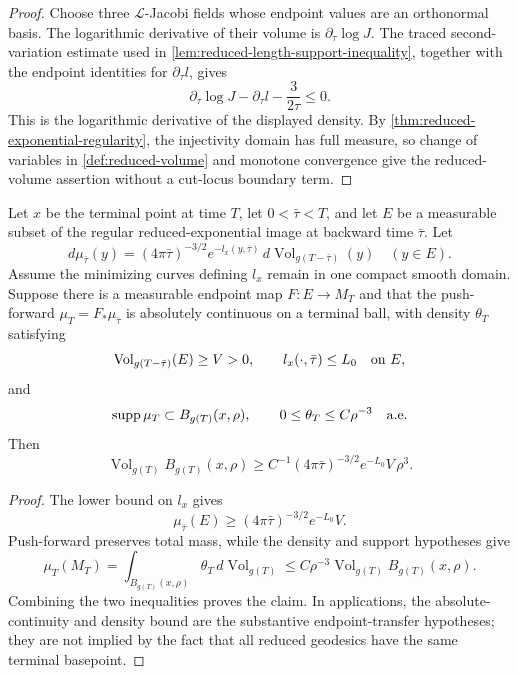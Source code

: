\begin{proof}
Choose three $\mathcal L$-Jacobi fields whose endpoint values are an
orthonormal basis.  The logarithmic derivative of their volume is
$\partial_\tau\log J$.  The traced second-variation estimate used in
\ref{lem:reduced-length-support-inequality}, together with the endpoint
identities for $\partial_\tau l$, gives
\[
 \partial_\tau\log J-\partial_\tau l-\frac{3}{2\tau}\le0.
\]
This is the logarithmic derivative of the displayed density.  By
\ref{thm:reduced-exponential-regularity}, the injectivity domain has full
measure, so change of variables in \ref{def:reduced-volume} and monotone
convergence give the reduced-volume assertion without a cut-locus boundary
term.
\end{proof}

\begin{theorem}
\label{thm:reduced-volume-transfer}
\notready
Let $x$ be the terminal point at time $T$, let $0<\bar\tau<T$, and let
$E$ be a measurable subset of the regular reduced-exponential image at
backward time $\bar\tau$.  Let
\[
 d\mu_{\bar\tau}(y)=(4\pi\bar\tau)^{-3/2}
 e^{-l_x(y,\bar\tau)}\,d\operatorname{Vol}_{g(T-\bar\tau)}(y)
 \quad (y\in E).
\]
Assume the minimizing curves defining $l_x$ remain in one compact smooth
domain.  Suppose there is a measurable endpoint map
$F:E\to M_T$ and that the push-forward $\mu_T=F_*\mu_{\bar\tau}$ is
absolutely continuous on a terminal ball, with density $\theta_T$ satisfying
 \[
 \operatorname{Vol}_{g(T-\bar\tau)}(E)\ge V>0,
 \qquad l_x(\cdot,\bar\tau)\le L_0\quad\hbox{on }E,
 \]
and
\[
 \operatorname{supp}\mu_T\subset B_{g(T)}(x,\rho),
 \qquad 0\le\theta_T\le C\rho^{-3}\quad\hbox{a.e.}
 \]
Then
\[
 \operatorname{Vol}_{g(T)}B_{g(T)}(x,\rho)
 \ge C^{-1}(4\pi\bar\tau)^{-3/2}e^{-L_0}V\,\rho^3.
\]
\end{theorem}

\begin{proof}
The lower bound on $l_x$ gives
\[
 \mu_{\bar\tau}(E)\ge(4\pi\bar\tau)^{-3/2}e^{-L_0}V.
\]
Push-forward preserves total mass, while the density and support hypotheses
give
\[
 \mu_T(M_T)=\int_{B_{g(T)}(x,\rho)}\theta_T\,d\operatorname{Vol}_{g(T)}
 \le C\rho^{-3}\operatorname{Vol}_{g(T)}B_{g(T)}(x,\rho).
\]
Combining the two inequalities proves the claim.  In applications, the
absolute-continuity and density bound are the substantive endpoint-transfer
hypotheses; they are not implied by the fact that all reduced geodesics have
the same terminal basepoint.
\end{proof}

